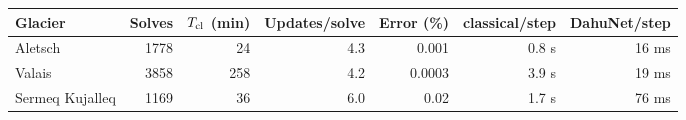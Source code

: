 \begin{tabular*}{\linewidth}{@{\extracolsep{\fill}}lrrrrrr@{}}
\toprule
Glacier & Solves & $T_{\rm cl}$ (min) & Updates/solve & Error (\%) & classical/step & DahuNet/step\\
\midrule
Aletsch & 1778 & 24 & 4.3 & 0.001 & 0.8 s & 16 ms \\
Valais & 3858 & 258 & 4.2 & 0.0003 & 3.9 s & 19 ms \\
Sermeq Kujalleq & 1169 & 36 & 6.0 & 0.02 & 1.7 s & 76 ms \\
\bottomrule
\end{tabular*}
